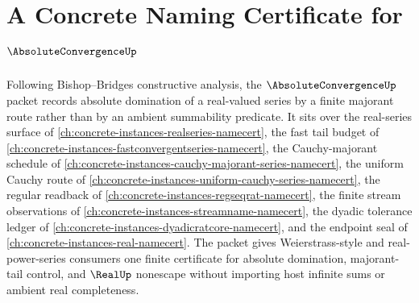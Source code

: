 \chapter{A Concrete Naming Certificate for $\AbsoluteConvergenceUp$}
\label{ch:concrete-instances-absolute-convergence-namecert}

Following Bishop--Bridges constructive analysis, the $\AbsoluteConvergenceUp$ packet records absolute domination of a real-valued series by a finite majorant route rather than by an ambient summability predicate. It sits over the real-series surface of \autoref{ch:concrete-instances-realseries-namecert}, the fast tail budget of \autoref{ch:concrete-instances-fastconvergentseries-namecert}, the Cauchy-majorant schedule of \autoref{ch:concrete-instances-cauchy-majorant-series-namecert}, the uniform Cauchy route of \autoref{ch:concrete-instances-uniform-cauchy-series-namecert}, the regular readback of \autoref{ch:concrete-instances-regseqrat-namecert}, the finite stream observations of \autoref{ch:concrete-instances-streamname-namecert}, the dyadic tolerance ledger of \autoref{ch:concrete-instances-dyadicratcore-namecert}, and the endpoint seal of \autoref{ch:concrete-instances-real-namecert}. The packet gives Weierstrass-style and real-power-series consumers one finite certificate for absolute domination, majorant-tail control, and $\RealUp$ nonescape without importing host infinite sums or ambient real completeness.

